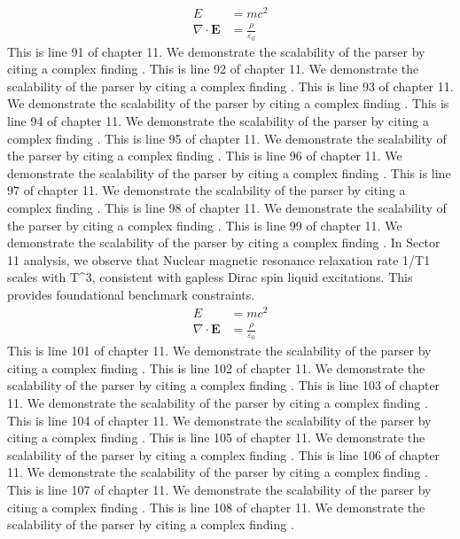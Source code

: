 \begin{align*}
  E &= mc^2 \\
  \nabla \cdot \mathbf{E} &= \frac{\rho}{\varepsilon_0}
\end{align*}
This is line 91 of chapter 11. We demonstrate the scalability of the parser by citing a complex finding \cite{ref11_91}.
This is line 92 of chapter 11. We demonstrate the scalability of the parser by citing a complex finding \cite{ref11_92}.
This is line 93 of chapter 11. We demonstrate the scalability of the parser by citing a complex finding \cite{ref11_93}.
This is line 94 of chapter 11. We demonstrate the scalability of the parser by citing a complex finding \cite{ref11_94}.
This is line 95 of chapter 11. We demonstrate the scalability of the parser by citing a complex finding \cite{ref11_95}.
This is line 96 of chapter 11. We demonstrate the scalability of the parser by citing a complex finding \cite{ref11_96}.
This is line 97 of chapter 11. We demonstrate the scalability of the parser by citing a complex finding \cite{ref11_97}.
This is line 98 of chapter 11. We demonstrate the scalability of the parser by citing a complex finding \cite{ref11_98}.
This is line 99 of chapter 11. We demonstrate the scalability of the parser by citing a complex finding \cite{ref11_99}.
In Sector 11 analysis, we observe that Nuclear magnetic resonance relaxation rate 1/T1 scales with T^3, consistent with gapless Dirac spin liquid excitations. This provides foundational benchmark constraints.
\begin{align*}
  E &= mc^2 \\
  \nabla \cdot \mathbf{E} &= \frac{\rho}{\varepsilon_0}
\end{align*}
This is line 101 of chapter 11. We demonstrate the scalability of the parser by citing a complex finding \cite{ref11_101}.
This is line 102 of chapter 11. We demonstrate the scalability of the parser by citing a complex finding \cite{ref11_102}.
This is line 103 of chapter 11. We demonstrate the scalability of the parser by citing a complex finding \cite{ref11_103}.
This is line 104 of chapter 11. We demonstrate the scalability of the parser by citing a complex finding \cite{ref11_104}.
This is line 105 of chapter 11. We demonstrate the scalability of the parser by citing a complex finding \cite{ref11_105}.
This is line 106 of chapter 11. We demonstrate the scalability of the parser by citing a complex finding \cite{ref11_106}.
This is line 107 of chapter 11. We demonstrate the scalability of the parser by citing a complex finding \cite{ref11_107}.
This is line 108 of chapter 11. We demonstrate the scalability of the parser by citing a complex finding \cite{ref11_108}.
